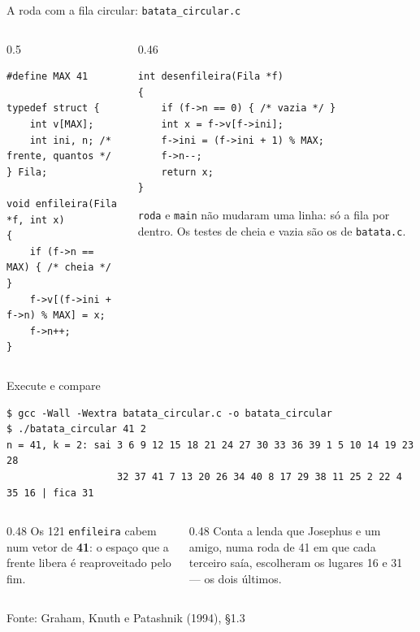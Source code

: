 \documentclass[aspectratio=169]{beamer}
\newcommand{\fonte}[1]{\vfill\hfill{\scriptsize\textcolor{UFSGray}{Fonte: #1}}}
\begin{document}
\begin{frame}[fragile]{A roda com a fila circular: \texttt{batata\_circular.c}}
  \begin{columns}[T]
    \begin{column}{0.5\textwidth}
\begin{lstlisting}[style=codC]
#define MAX 41

typedef struct {
    int v[MAX];
    int ini, n; /* frente, quantos */
} Fila;

void enfileira(Fila *f, int x)
{
    if (f->n == MAX) { /* cheia */ }
    f->v[(f->ini + f->n) % MAX] = x;
    f->n++;
}
\end{lstlisting}
    \end{column}
    \begin{column}{0.46\textwidth}
\begin{lstlisting}[style=codC]
int desenfileira(Fila *f)
{
    if (f->n == 0) { /* vazia */ }
    int x = f->v[f->ini];
    f->ini = (f->ini + 1) % MAX;
    f->n--;
    return x;
}
\end{lstlisting}
      \small \texttt{roda} e \texttt{main} não mudaram uma linha: só a
      fila por dentro. Os testes de cheia e vazia são os de
      \texttt{batata.c}.
    \end{column}
  \end{columns}
\end{frame}

\begin{frame}[fragile]{Execute e compare}
\begin{lstlisting}[style=shellStyle]
$ gcc -Wall -Wextra batata_circular.c -o batata_circular
$ ./batata_circular 41 2
n = 41, k = 2: sai 3 6 9 12 15 18 21 24 27 30 33 36 39 1 5 10 14 19 23 28
                   32 37 41 7 13 20 26 34 40 8 17 29 38 11 25 2 22 4 35 16 | fica 31
\end{lstlisting}
  \begin{columns}[T]
    \begin{column}{0.48\textwidth}
      \small Os 121 \texttt{enfileira} cabem num vetor de \textbf{41}: o
      espaço que a frente libera é reaproveitado pelo fim.
    \end{column}
    \begin{column}{0.48\textwidth}
      \small Conta a lenda que Josephus e um amigo, numa roda de 41 em que
      cada terceiro saía, escolheram os lugares 16 e 31 --- os dois
      últimos.
    \end{column}
  \end{columns}
  \fonte{Graham, Knuth e Patashnik (1994), §1.3~\cite{graham1994concrete}}
\end{frame}
\end{document}
